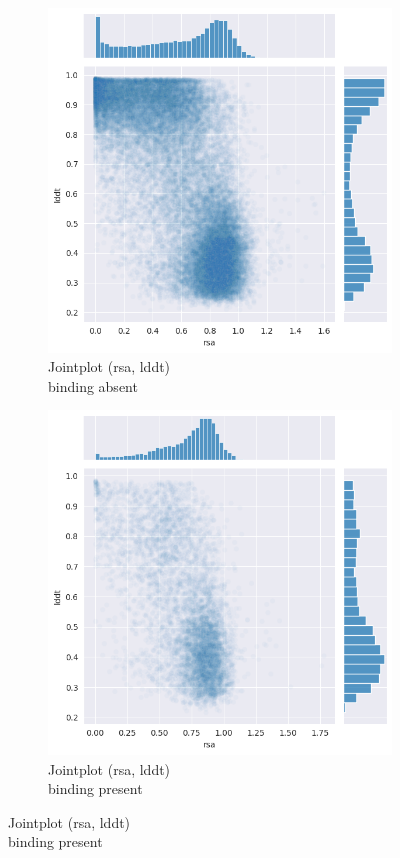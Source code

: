 \begin{figure}[h!]
    \begin{subfigure}{0.5\linewidth}
        \includegraphics[width=\linewidth]{res/analysis/plots/bind0-jointplot_rsa-lddt.png}
        \caption{Jointplot (rsa, lddt)\\binding absent}
    \end{subfigure}
    \begin{subfigure}{0.5\linewidth}
        \includegraphics[width=\linewidth]{res/analysis/plots/bind1-jointplot_rsa-lddt.png}
        \caption{Jointplot (rsa, lddt)\\binding present}
    \end{subfigure}
\end{figure}

